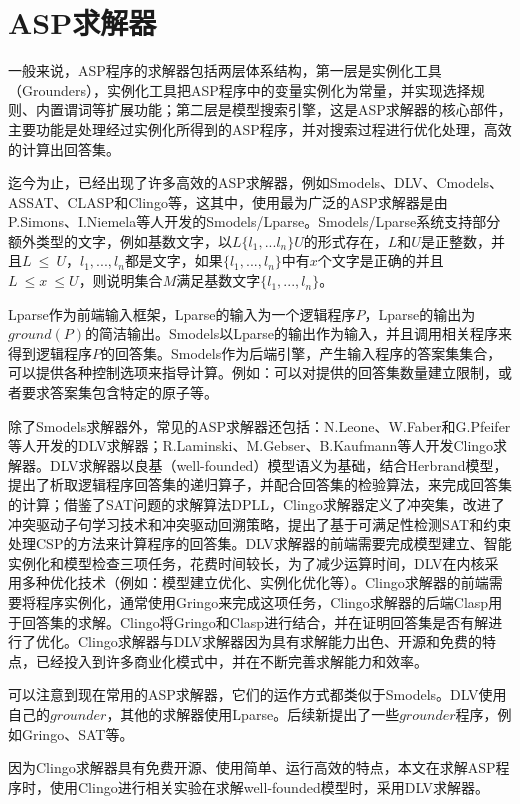 \section{ASP求解器}
一般来说，ASP程序的求解器包括两层体系结构，第一层是实例化工具（Grounders），实例化工具把ASP程序中的变量实例化为常量，并实现选择规则、内置谓词等扩展功能；第二层是模型搜索引擎，这是ASP求解器的核心部件，主要功能是处理经过实例化所得到的ASP程序，并对搜索过程进行优化处理，高效的计算出回答集。

迄今为止，已经出现了许多高效的ASP求解器，例如Smodels\cite{2000Proceedings}、DLV\cite{2005The}、Cmodels\cite{2004SAT}、ASSAT\cite{lin2004assat}、CLASP\cite{gebserGringoNewGrounder2007}和Clingo\cite{2007clasp}等，这其中，使用最为广泛的ASP求解器是由P.Simons、I.Niemela等人开发的Smodels/Lparse。Smodels/Lparse系统支持部分额外类型的文字，例如基数文字，以$L\{l_1,...l_n\}U$的形式存在，$L$和$U$是正整数，并且$L \ \leqslant \ U$，$l_1,...,l_n$都是文字，如果$\{l_1,...,l_n\}$中有$x$个文字是正确的并且$L \ \leqslant x \ \leqslant U$，则说明集合$M$满足基数文字$\{l_1,...,l_n\}$。

Lparse作为前端输入框架，Lparse的输入为一个逻辑程序$P$，Lparse的输出为$ground(P)$的简洁输出。Smodels以Lparse的输出作为输入，并且调用相关程序来得到逻辑程序$P$的回答集。Smodels作为后端引擎，产生输入程序的答案集集合，可以提供各种控制选项来指导计算。例如：可以对提供的回答集数量建立限制，或者要求答案集包含特定的原子等。

除了Smodels求解器外，常见的ASP求解器还包括：N.Leone、W.Faber和G.Pfeifer等人开发的DLV求解器；R.Laminski、M.Gebser、B.Kaufmann等人开发Clingo求解器。DLV求解器以良基（well-founded）模型语义为基础，结合Herbrand模型，提出了析取逻辑程序回答集的递归算子，并配合回答集的检验算法，来完成回答集的计算；借鉴了SAT问题的求解算法DPLL，Clingo求解器定义了冲突集，改进了冲突驱动子句学习技术和冲突驱动回溯策略，提出了基于可满足性检测SAT和约束处理CSP的方法来计算程序的回答集。DLV求解器的前端需要完成模型建立、智能实例化和模型检查三项任务，花费时间较长，为了减少运算时间，DLV在内核采用多种优化技术（例如：模型建立优化、实例化优化等）。Clingo求解器的前端需要将程序实例化，通常使用Gringo来完成这项任务，Clingo求解器的后端Clasp用于回答集的求解。Clingo将Gringo和Clasp进行结合，并在证明回答集是否有解进行了优化。Clingo求解器与DLV求解器因为具有求解能力出色、开源和免费的特点，已经投入到许多商业化模式中，并在不断完善求解能力和效率。

可以注意到现在常用的ASP求解器，它们的运作方式都类似于Smodels。DLV使用自己的$grounder$，其他的求解器使用Lparse。后续新提出了一些$grounder$程序，例如Gringo、SAT等。

因为Clingo求解器具有免费开源、使用简单、运行高效的特点，本文在求解ASP程序时，使用Clingo进行相关实验在求解well-founded模型时，采用DLV求解器。


